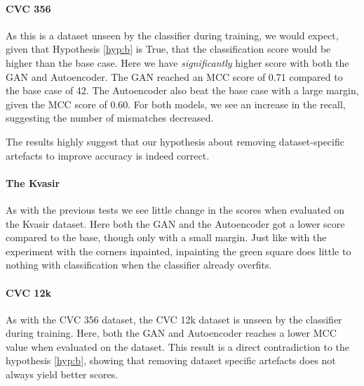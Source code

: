 
\paragraph{CVC 356}
As this is a dataset unseen by the classifier during training, we would expect, given that Hypothesis \ref{hyp:b} is True, that the classification score would be higher than the base case.
Here we have \textit{significantly} higher score with both the GAN and Autoencoder. 
The GAN reached an MCC score of 0.71 compared to the base case of 42. The Autoencoder also beat the base case with a large margin, given the MCC score of 0.60. 
For both models, we see an increase in the recall, suggesting the number of mismatches decreased. 

The results highly suggest that our hypothesis about removing dataset-specific artefacts to improve accuracy is indeed correct. 

\paragraph{The Kvasir}
As with the previous tests we see little change in the scores when evaluated on the Kvasir dataset.
Here both the GAN and the Autoencoder got a lower score compared to the base, though only with a small margin. Just like with the experiment with the corners inpainted, inpainting the green square does little to nothing with classification when the classifier already overfits.


\paragraph{CVC 12k}
As with the CVC 356 dataset, the CVC 12k dataset is unseen by the classifier during training. 
Here, both the GAN and Autoencoder reaches a lower MCC value when evaluated on the dataset. 
This result is a direct contradiction to the hypothesis \ref{hyp:b}, showing that removing dataset specific artefacts does not always yield better scores.















































